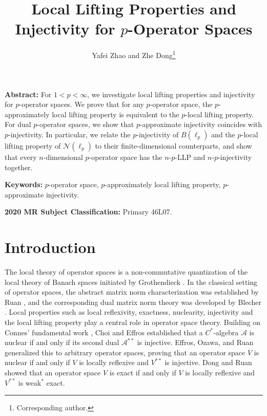 \documentclass[12pt]{article}
\title{Local Lifting Properties and Injectivity for $p$-Operator Spaces}
\author{Yafei Zhao and Zhe Dong\thanks{Corresponding author.}}
\date{}
\begin{document}
\maketitle

\begin{center}
\begin{minipage}{11.5cm}
{\bf Abstract:} For $1<p<\infty$, we investigate local lifting properties and injectivity for $p$-operator spaces. We prove that for any $p$-operator space, the $p$-approximately local lifting property is equivalent to the $p$-local lifting property. For dual $p$-operator spaces, we show that $p$-approximate injectivity coincides with $p$-injectivity. In particular,  we relate the $p$-injectivity of $B(\ell_p)$ and the $p$-local lifting property of $\mathcal{N}(\ell_p)$ to their finite-dimensional counterparts, and show that every $n$-dimensional $p$-operator space has the $n$-$p$-LLP and  $n$-$p$-injectivity together.
\par
{\bf Keywords:} $p$-operator space, $p$-approximately local lifting property,
$p$-approximate injectivity.
\par
{\bf 2020 MR Subject Classification:} Primary 46L07.
\end{minipage}
\end{center}

\section{Introduction}

The local theory of operator spaces is a non-commutative quantization of the local theory of Banach spaces initiated by Grothendieck \cite{Gr55}. In the classical setting of operator spaces, the abstract matrix norm characterization was established by Ruan \cite{Ru89}, and the corresponding dual matrix norm theory was developed by Blecher \cite{Ble92}. Local properties such as local reflexivity, exactness, nuclearity, injectivity and the local lifting property play a central role in operator space theory. Building on Connes' fundamental work \cite{Co76}, Choi and Effros \cite{CE76,CE77b} established that a $C^*$-algebra $\mathcal{A}$ is nuclear if and only if its second dual $\mathcal{A}^{**}$ is injective. Effros, Ozawa, and Ruan \cite{EOR01} generalized this to arbitrary operator spaces, proving that an operator space $V$ is nuclear if and only if $V$ is locally reflexive and $V^{**}$ is injective. Dong and Ruan \cite{DR07} showed that an operator space $V$ is exact if and only if $V$ is locally reflexive and $V^{**}$ is weak$^*$ exact.
\end{document}
